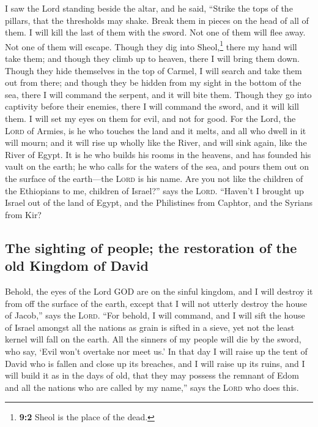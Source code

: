  I saw the Lord standing beside the altar, and he said,
``Strike the tops of the pillars, that the thresholds may shake. Break
them in pieces on the head of all of them. I will kill the last of them
with the sword. Not one of them will flee away. Not one of them will
escape.  Though they dig into Sheol,\footnote{\textbf{9:2}
  Sheol is the place of the dead.} there my hand will take them; and
though they climb up to heaven, there I will bring them down.
 Though they hide themselves in the top of Carmel, I will
search and take them out from there; and though they be hidden from my
sight in the bottom of the sea, there I will command the serpent, and it
will bite them.  Though they go into captivity before
their enemies, there I will command the sword, and it will kill them. I
will set my eyes on them for evil, and not for good.  For
the Lord, the \textsc{Lord} of Armies, is he who touches the land and it
melts, and all who dwell in it will mourn; and it will rise up wholly
like the River, and will sink again, like the River of Egypt.
 It is he who builds his rooms in the heavens, and has
founded his vault on the earth; he who calls for the waters of the sea,
and pours them out on the surface of the earth---the \textsc{Lord} is
his name.  Are you not like the children of the Ethiopians
to me, children of Israel?'' says the \textsc{Lord}. ``Haven't I brought
up Israel out of the land of Egypt, and the Philistines from Caphtor,
and the Syrians from Kir?

\hypertarget{the-sighting-of-people-the-restoration-of-the-old-kingdom-of-david}{%
\subsection{The sighting of people; the restoration of the old Kingdom
of
David}\label{the-sighting-of-people-the-restoration-of-the-old-kingdom-of-david}}

 Behold, the eyes of the Lord GOD are on the sinful
kingdom, and I will destroy it from off the surface of the earth, except
that I will not utterly destroy the house of Jacob,'' says the
\textsc{Lord}.  ``For behold, I will command, and I will
sift the house of Israel amongst all the nations as grain is sifted in a
sieve, yet not the least kernel will fall on the earth. 
All the sinners of my people will die by the sword, who say, `Evil won't
overtake nor meet us.'  In that day I will raise up the
tent of David who is fallen and close up its breaches, and I will raise
up its ruins, and I will build it as in the days of old, 
that they may possess the remnant of Edom and all the nations who are
called by my name,'' says the \textsc{Lord} who does this.

